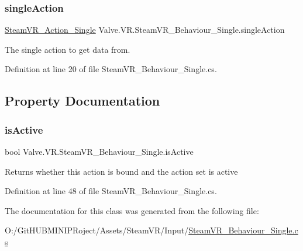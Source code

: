 \subsubsection{\texorpdfstring{singleAction}{singleAction}}
{\footnotesize\ttfamily \mbox{\hyperlink{class_valve_1_1_v_r_1_1_steam_v_r___action___single}{Steam\+V\+R\+\_\+\+Action\+\_\+\+Single}} Valve.\+V\+R.\+Steam\+V\+R\+\_\+\+Behaviour\+\_\+\+Single.\+single\+Action}



The single action to get data from. 



Definition at line 20 of file Steam\+V\+R\+\_\+\+Behaviour\+\_\+\+Single.\+cs.



\subsection{Property Documentation}
\mbox{\label{class_valve_1_1_v_r_1_1_steam_v_r___behaviour___single_a757e6ba799cdbe24713de6c515e51f01}} 
\subsubsection{\texorpdfstring{isActive}{isActive}}
{\footnotesize\ttfamily bool Valve.\+V\+R.\+Steam\+V\+R\+\_\+\+Behaviour\+\_\+\+Single.\+is\+Active\hspace{0.3cm}{\ttfamily [get]}}



Returns whether this action is bound and the action set is active 



Definition at line 48 of file Steam\+V\+R\+\_\+\+Behaviour\+\_\+\+Single.\+cs.



The documentation for this class was generated from the following file\+:\begin{DoxyCompactItemize}
\item 
O\+:/\+Git\+H\+U\+B\+M\+I\+N\+I\+P\+Roject/\+Assets/\+Steam\+V\+R/\+Input/\mbox{\hyperlink{_steam_v_r___behaviour___single_8cs}{Steam\+V\+R\+\_\+\+Behaviour\+\_\+\+Single.\+cs}}\end{DoxyCompactItemize}
